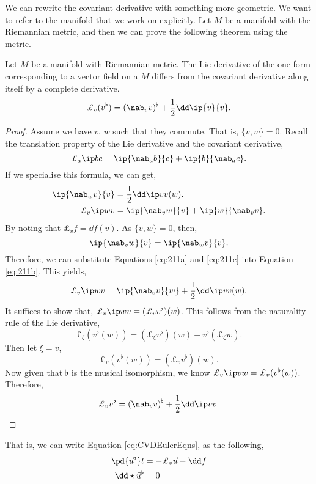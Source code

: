 \noindent
We can rewrite the covariant derivative with something more geometric. We want to refer to the manifold that we work on explicitly. Let $M$ be a manifold with the Riemannian metric, and then we can prove the following theorem using the metric.
\begin{nthm}
  Let $M$ be a manifold with Riemannian metric. The Lie derivative of the one-form corresponding to a vector field on a $M$ differs from the covariant derivative along itself by a complete derivative.
  $$ \pounds_v (v^\flat) = (\nab_vv)^\flat + \frac{1}{2}\dd \ip{v}{v}. $$
\end{nthm}
\begin{proof}
  Assume we have $v$, $w$ such that they commute. That is, $\{v, w\} = 0$. Recall the translation property of the Lie derivative and the covariant derivative,
  $$ \pounds_a \ip b c = \ip{\nab_a b}{c} + \ip{b}{\nab_a c}. $$
  If we specialise this formula, we can get,
  \begin{align}
    \ip{\nab_w v}{v} &= \frac{1}{2}\dd\ip v v (w). \label{eq:211a}\\
    \pounds_v \ip w v &= \ip{\nab_v w}{v} + \ip{w}{\nab_v v}.\label{eq:211b}
  \end{align}
  By noting that $\pounds_v f = \dd f(v)$. As $\{v, w\} = 0$, then,
  \begin{equation}
    \ip{\nab_v w}{v} = \ip{\nab_w v}{v}.\label{eq:211c}
  \end{equation}
  Therefore, we can substitute Equations \ref{eq:211a} and \ref{eq:211c} into Equation \ref{eq:211b}. This yields,
  $$ \pounds_v \ip w v = \ip{\nab_v v}{w} + \frac{1}{2}\dd \ip v v (w). $$
  It suffices to show that, $\pounds_v \ip w v = (\pounds_v v^\flat) (w)$. This follows from the naturality rule of the Lie derivative,
  $$ \pounds_\xi (v^\flat (w)) = (\pounds_\xi v^\flat) (w) + v^\flat (\pounds_\xi w). $$
  Then let $\xi = v$,
  $$ \pounds_v (v^\flat(w)) = (\pounds_v v^\flat)(w). $$
  Now given that $\flat$ is the musical isomorphism, we know $\pounds_v \ip v w = \pounds_v (v^\flat(w))$. Therefore,
  $$ \pounds_v v^\flat = (\nab_v v)^\flat + \frac{1}{2}\dd \ip v v. $$
\end{proof}

\noindent
That is, we can write Equation \ref{eq:CVDEulerEqns}, as the following,
\begin{equation}
  \begin{split}
    \pd {\vec u^\flat} t &= -\pounds_v \vec u - \dd f \\
    \dd \star \vec u^\flat &= 0
  \end{split}
\end{equation}

